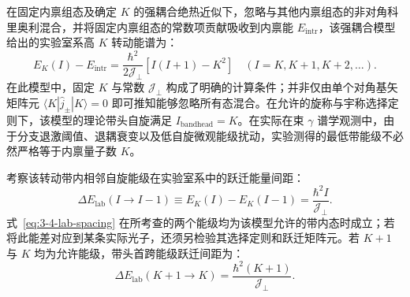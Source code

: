 在固定内禀组态及确定 $K$ 的强耦合绝热近似下，忽略与其他内禀组态的非对角科里奥利混合，并将固定内禀组态的常数项贡献吸收到内禀能 $E_{\text{intr}}$，该强耦合模型给出的实验室系高 $K$ 转动能谱为：
\begin{equation}\label{eq:3-4-high-K-spectrum}
E_K(I) - E_{\text{intr}} = \frac{\hbar^2}{2\mathcal{J}_\perp} \left[ I(I+1) - K^2 \right] \quad (I = K, K+1, K+2, \dots).
\end{equation}
在此模型中，固定 $K$ 与常数 $\mathcal{J}_\perp$ 构成了明确的计算条件；并非仅由单个对角基矢矩阵元 $\langle K | \hat{j}_\pm | K \rangle = 0$ 即可推知能够忽略所有态混合。在允许的旋称与宇称选择定则下，该模型的理论带头自旋满足 $I_{\text{bandhead}} = K$。在实际在束 $\gamma$ 谱学观测中，由于分支退激阈值、退耦衰变以及低自旋微观能级扰动，实验测得的最低带能级不必然严格等于内禀量子数 $K$。

考察该转动带内相邻自旋能级在实验室系中的跃迁能量间距：
\begin{equation}\label{eq:3-4-lab-spacing}
\Delta E_{\text{lab}}(I \to I-1) \equiv E_K(I) - E_K(I-1) = \frac{\hbar^2 I}{\mathcal{J}_\perp}.
\end{equation}
式~\eqref{eq:3-4-lab-spacing} 在所考查的两个能级均为该模型允许的带内态时成立；若将此能差对应到某条实际光子，还须另检验其选择定则和跃迁矩阵元。若 $K+1$ 与 $K$ 均为允许能级，带头首跨能级跃迁间距为：
\begin{equation}\label{eq:3-4-first-lab-spacing}
\Delta E_{\text{lab}}(K+1 \to K) = \frac{\hbar^2 (K+1)}{\mathcal{J}_\perp}.
\end{equation}

